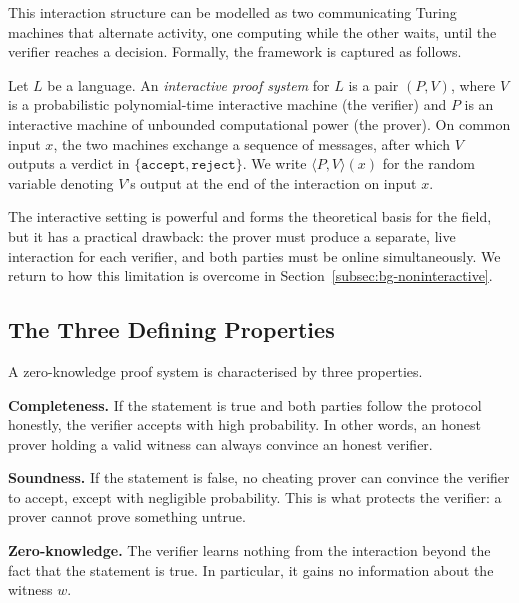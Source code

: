 \medskip

This interaction structure can be modelled as two communicating Turing machines that alternate activity, one computing while the other waits, until the verifier reaches a decision. Formally, the framework is captured as follows.

\begin{definition}
\label{def:interactive-proof}
Let $L$ be a language. An \emph{interactive proof system} for $L$ is a pair $(P, V)$, where $V$ is a probabilistic polynomial-time interactive machine (the verifier) and $P$ is an interactive machine of unbounded computational power (the prover). On common input $x$, the two machines exchange a sequence of messages, after which $V$ outputs a verdict in $\{\mathtt{accept}, \mathtt{reject}\}$. We write $\langle P, V \rangle(x)$ for the random variable denoting $V$'s output at the end of the interaction on input $x$.
\end{definition}

The interactive setting is powerful and forms the theoretical basis for the field, but it has a practical drawback: the prover must produce a separate, live interaction for each verifier, and both parties must be online simultaneously. We return to how this limitation is overcome in Section~\ref{subsec:bg-noninteractive}.

\subsection{The Three Defining Properties}
\label{subsec:bg-properties}

A zero-knowledge proof system is characterised by three properties.

\medskip

\textbf{Completeness.} If the statement is true and both parties follow the protocol honestly, the verifier accepts with high probability. In other words, an honest prover holding a valid witness can always convince an honest verifier.

\medskip

\textbf{Soundness.} If the statement is false, no cheating prover can convince the verifier to accept, except with negligible probability. This is what protects the verifier: a prover cannot prove something untrue.

\medskip

\textbf{Zero-knowledge.} The verifier learns nothing from the interaction beyond the fact that the statement is true. In particular, it gains no information about the witness $w$.

